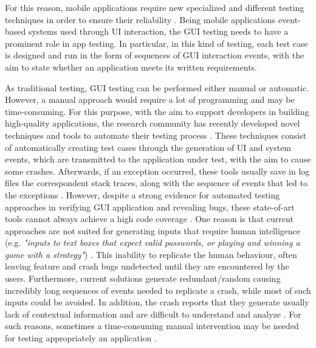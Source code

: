 For this reason, mobile applications require new specialized and different testing techniques in order to ensure their reliability \cite{muccini}. Being mobile applications event-based systems used through UI interaction, the GUI testing needs to have a prominent role in app testing. In particular, in this kind of testing, each test case is designed and run in the form of sequences of GUI interaction events, with the aim to state whether an application meets its written requirements. 

As traditional testing, GUI testing can be performed either manual or automatic. However, a manual approach would require a lot of programming and may be time-consuming. 
For this purpose, with the aim to support developers in building high-quality applications, the research community has recently developed novel techniques and tools to automate their testing process \cite{sapienz, dynodroid ,muccini,Hu:2011:AGT:1982595.1982612}. 
These techniques consist of automatically creating test cases through the generation of UI and system events, which are transmitted to the application under test, with the aim to cause some crashes. Afterwards, if an exception occurred, these tools usually save in log files the correspondent stack traces, along with the sequence of events that led to the exceptions \cite{muccini}. 
However, despite a strong evidence for automated testing approaches in verifying GUI application and revealing bugs, these state-of-art tools cannot always achieve a high code coverage \cite{Nagappan2015}. 
One reason is that current approaches are not suited for generating inputs that require human intelligence (e.g. \textit{"inputs to text boxes that expect valid passwords, or playing and winning a game with a strategy"}) \cite{dynodroid}. This inability to replicate the human behaviour, often leaving feature and crash bugs undetected until they are encountered by the users.
Furthermore, current solutions generate redundant/random causing incredibly long sequences of events needed to replicate a crash, while most of such inputs could be avoided. 
In addition, the crash reports that they generate usually lack of contextual information and are difficult to understand and analyze \cite{Chen, Joorabchi}. 
For such reasons, sometimes a time-consuming manual intervention may be needed for testing appropriately an application \cite{Nagappan2015}. 

